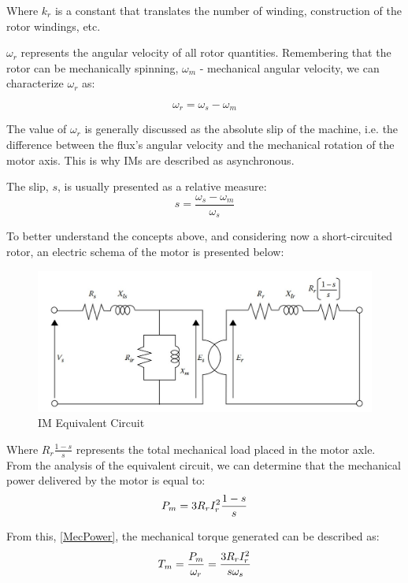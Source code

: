 Where $k_r$ is a constant that translates the number of winding, construction of the rotor windings, etc.

$\omega_r$ represents the angular velocity of all rotor quantities. Remembering that the rotor can be mechanically spinning, $\omega_m$ - mechanical angular velocity, we can characterize $\omega_r$ as:

\begin{equation}
    \omega_r = \omega_s - \omega_m
\end{equation}

The value of $\omega_r$ is generally discussed as the absolute slip of the machine, i.e. the difference between the flux's angular velocity and the mechanical rotation of the motor axis. This is why IMs are described as asynchronous.

The slip, $s$, is usually presented as a relative measure:
\begin{equation}
    s = \frac{\omega_s-\omega_m}{\omega_s}
\end{equation}

To better understand the concepts above, and considering now a short-circuited rotor, an electric schema of the motor is presented below:
\begin{figure}[ht]
    \centering
    \includegraphics[scale = 0.45]{Figures/InductionMotorEquiv.jpg}
    \caption{IM Equivalent Circuit \cite{BibBase}}
    \label{fig:my_label}
\end{figure}

Where $R_r\frac{1-s}{s}$ represents the total mechanical load placed in the motor axle.
From the analysis of the equivalent circuit, we can determine that the mechanical power delivered by the motor is equal to:
\begin{equation}\label{MecPower}
    P_m = 3\*R_r\*I_r^2\*\frac{1-s}{s}
\end{equation}

From this, \ref{MecPower}, the mechanical torque generated can be described as:
\begin{equation}
    T_m = \frac{P_m}{\omega_r} = \frac{3\*R_r\*I_r^2}{s\*\omega_s}
\end{equation}

